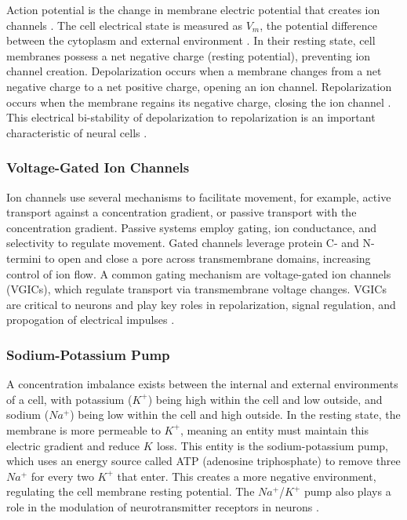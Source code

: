 \documentclass{article} %
\begin{document}
\begin{multicols}{2}
Action potential is the change in membrane electric potential that creates ion channels \cite{rubaiy2017electrophysiology}. 
The cell electrical state is measured as $V_{m}$, the potential difference between the cytoplasm and external environment \cite{cervera2016bioelectrical}. 
In their resting state, cell membranes possess a net negative charge (resting potential), preventing ion channel creation. 
Depolarization occurs when a membrane changes from a net negative charge to a net positive charge, opening an ion channel. 
Repolarization occurs when the membrane regains its negative charge, closing the ion channel \cite{rubaiy2017electrophysiology}. 
This electrical bi-stability of depolarization to repolarization is an important characteristic of neural cells \cite{cervera2016bioelectrical}.

\subsubsection{Voltage-Gated Ion Channels}
\label{subsubsec:vgic}

Ion channels use several mechanisms to facilitate movement, for example, active transport against a concentration gradient, or passive transport with the concentration gradient. Passive systems employ gating, ion conductance, and selectivity to regulate movement. Gated channels leverage protein C- and N-termini to open and close a pore across transmembrane domains, increasing control of ion flow. A common gating mechanism are voltage-gated ion channels (VGICs), which regulate transport via transmembrane voltage changes. VGICs are critical to neurons and play key roles in repolarization, signal regulation, and propogation of electrical impulses \cite{rubaiy2017electrophysiology}. 

\subsubsection{Sodium-Potassium Pump}
\label{subsubsec:na_k_pump}

A concentration imbalance exists between the internal and external environments of a cell, with potassium ($K^{+}$) being high within the cell and low outside, and sodium ($Na^{+}$) being low within the cell and high outside. In the resting state, the membrane is more permeable to $K^{+}$, meaning an entity must maintain this electric gradient and reduce $K^{}$ loss. This entity is the sodium-potassium pump, which uses an energy source called ATP (adenosine triphosphate) to remove three $Na^{+}$ for every two $K^{+}$ that enter. This creates a more negative environment, regulating the cell membrane resting potential. The $Na^{+}$/$K^{+}$ pump also plays a role in the modulation of neurotransmitter receptors in neurons \cite{pivovarov2018na/kpump}. 


\end{multicols}
\end{document}
